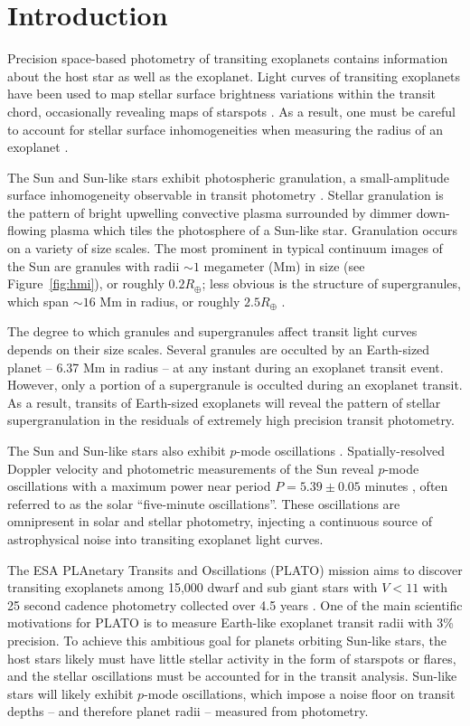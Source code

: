\section{Introduction}
 
Precision space-based photometry of transiting exoplanets contains information about the host star as well as the exoplanet. Light curves of transiting exoplanets have been used to map stellar surface brightness variations within the transit chord, occasionally revealing maps of starspots \citep[see e.g.][]{Desert2011, Sanchis-Ojeda2011, Bonomo2012, Davenport2015thesis, Morris2017a, Morris2018b}. As a result, one must be careful to account for stellar surface inhomogeneities when measuring the radius of an exoplanet \citep{robin}. 

The Sun and Sun-like stars exhibit photospheric granulation, a small-amplitude surface inhomogeneity observable in transit photometry \citep{Chiavassa2017}. Stellar granulation is the pattern of bright upwelling convective plasma surrounded by dimmer down-flowing plasma which tiles the photosphere of a Sun-like star. Granulation occurs on a variety of size scales. The most prominent in typical continuum images of the Sun are granules with radii $\sim 1$ megameter (Mm) in size (see Figure~\ref{fig:hmi}), or roughly $0.2 R_\oplus$; less obvious is the structure of supergranules, which span $\sim 16$ Mm in radius, or roughly $2.5R_\oplus$ \citep{Rast2003}. 

The degree to which granules and supergranules affect transit light curves depends on their size scales. Several granules are occulted by an Earth-sized planet -- 6.37 Mm in radius -- at any instant during an exoplanet transit event. However, only a portion of a supergranule is occulted during an exoplanet transit. As a result, transits of Earth-sized exoplanets will reveal the pattern of stellar supergranulation in the residuals of extremely high precision transit photometry. 

The Sun and Sun-like stars also exhibit $p$-mode oscillations \citep{Christensen-Dalsgaard2002}. Spatially-resolved Doppler velocity and photometric measurements of the Sun reveal $p$-mode oscillations with a maximum power near period $P=5.39 \pm 0.05$ minutes \citep{Fröhlich1997, Huber2011}, often referred to as the solar ``five-minute oscillations''. These oscillations are omnipresent in solar and stellar photometry, injecting a continuous source of astrophysical noise into transiting exoplanet light curves.

The ESA PLAnetary Transits and Oscillations (PLATO) mission aims to discover transiting exoplanets among 15,000 dwarf and sub giant stars with $V<11$ with 25 second cadence photometry collected over 4.5 years \citep{Rauer2014}. One of the main scientific motivations for PLATO is to measure Earth-like exoplanet transit radii with 3\% precision. To achieve this ambitious goal for planets orbiting Sun-like stars, the host stars likely must have little stellar activity in the form of starspots or flares, and the stellar oscillations must be accounted for in the transit analysis. Sun-like stars will likely exhibit $p$-mode oscillations, which impose a noise floor on transit depths -- and therefore planet radii -- measured from photometry. 

